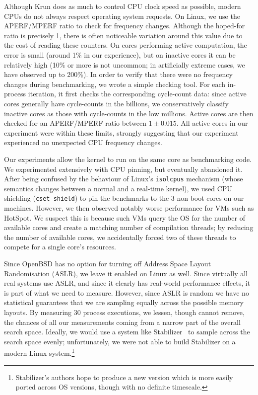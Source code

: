 \documentclass[acmlarge]{acmart}\settopmatter{printfolios=true}
\newcommand{\krun}{Krun\xspace}
\begin{document}
Although \krun does as much to control CPU clock speed as possible, modern CPUs
do not always respect operating system requests. On Linux, we use the
APERF/MPERF ratio to check for frequency changes. Although the hoped-for
ratio is precisely 1, there is often noticeable variation around this value due to the
cost of reading these counters. On cores
performing active computation, the error is small (around 1\% in our
experience), but on inactive cores it can be relatively high (10\% or more is
not uncommon; in artificially extreme cases, we have observed up to 200\%).
In order to verify that there were no frequency changes during benchmarking,
we wrote a simple checking tool. For each in-process iteration, it first checks
the corresponding cycle-count data: since active cores generally have
cycle-counts in the billions, we conservatively classify inactive
cores as those with cycle-counts in the low millions. Active cores are then
checked for an APERF/MPERF ratio between $1 \pm 0.015$. All active cores in our
experiment were within these limits, strongly suggesting that our experiment
experienced no unexpected CPU frequency changes.

Our experiments allow the kernel to run on the same core as benchmarking code.
We experimented extensively with CPU pinning, but eventually abandoned it. After
being confused by the behaviour of Linux's \texttt{isolcpus} mechanism (whose
semantics changes between a normal and a real-time kernel), we used CPU shielding
(\texttt{cset shield}) to pin the benchmarks to the 3 non-boot cores on our
machines. However, we then observed notably worse performance for VMs such as
HotSpot. We suspect this is because such VMs query the OS for the number of
available cores and create a matching number of compilation threads; by reducing
the number of available cores, we accidentally forced two of these threads to
compete for a single core's resources.

Since OpenBSD has no option for turning off Address Space Layout Randomisation
(ASLR), we leave it enabled on Linux as well. Since virtually all real systems
use ASLR, and since it clearly has real-world performance effects, it is part of
what we need to measure. However, since ASLR is random we have no statistical
guarantees that we are sampling equally across the possible memory layouts. By
measuring 30 process executions, we lessen, though cannot remove, the chances of
all our measurements coming from a narrow part of the overall search space.
Ideally, we would use a system like Stabilizer~\cite{curtsinger13stabilizer} to
sample across the search space evenly; unfortunately, we were not able to build
Stabilizer on a modern Linux system.\footnote{Stabilizer's authors hope to
produce a new version which is more easily ported across OS versions, though
with no definite timescale.}
\end{document}
